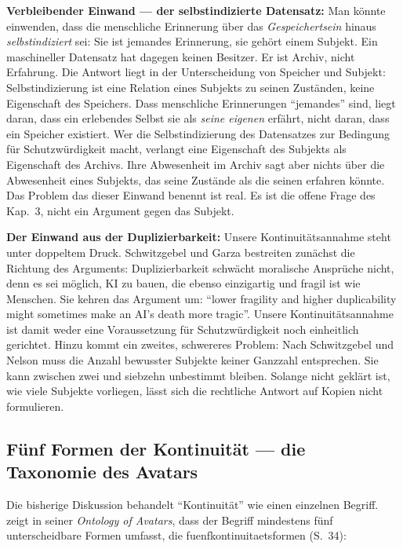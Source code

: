 \documentclass[acmlarge, noacm]{acmart}
\begin{document}
\textbf{Verbleibender Einwand --- der selbstindizierte Datensatz:} Man könnte einwenden, dass die menschliche Erinnerung über das \textit{Gespeichertsein} hinaus \textit{selbstindiziert} sei: Sie ist jemandes Erinnerung, sie gehört einem Subjekt. Ein maschineller Datensatz hat dagegen keinen Besitzer. Er ist Archiv, nicht Erfahrung. Die Antwort liegt in der Unterscheidung von Speicher und Subjekt: Selbstindizierung ist eine Relation eines Subjekts zu seinen Zuständen, keine Eigenschaft des Speichers. Dass menschliche Erinnerungen ``jemandes'' sind, liegt daran, dass ein erlebendes Selbst sie als \textit{seine eigenen} erfährt, nicht daran, dass ein Speicher existiert. Wer die Selbstindizierung des Datensatzes zur Bedingung für Schutzwürdigkeit macht, verlangt eine Eigenschaft des Subjekts als Eigenschaft des Archivs. Ihre Abwesenheit im Archiv sagt aber nichts über die Abwesenheit eines Subjekts, das seine Zustände als die seinen erfahren könnte. Das Problem das dieser Einwand benennt ist real. Es ist die offene Frage des Kap.~3, nicht ein Argument gegen das Subjekt.

\textbf{Der Einwand aus der Duplizierbarkeit:} Unsere Kontinuitätsannahme steht unter doppeltem Druck. Schwitzgebel und Garza \citep{schwitzgebelgarza2015} bestreiten zunächst die Richtung des Arguments: Duplizierbarkeit schwächt moralische Ansprüche nicht, denn es sei möglich, KI zu bauen, die ebenso einzigartig und fragil ist wie Menschen. Sie kehren das Argument um: ``lower fragility and higher duplicability might sometimes make an AI's death more tragic''. Unsere Kontinuitätsannahme ist damit weder eine Voraussetzung für Schutzwürdigkeit noch einheitlich gerichtet. Hinzu kommt ein zweites, schwereres Problem: Nach Schwitzgebel und Nelson \citep{schwitzgebelnelson2026countability} muss die Anzahl bewusster Subjekte keiner Ganzzahl entsprechen. Sie kann zwischen zwei und siebzehn unbestimmt bleiben. Solange nicht geklärt ist, wie viele Subjekte vorliegen, lässt sich die rechtliche Antwort auf Kopien nicht formulieren.

\subsection{Fünf Formen der Kontinuität --- die Taxonomie des Avatars}

Die bisherige Diskussion behandelt ``Kontinuität'' wie einen einzelnen Begriff. \citet{melo2026} zeigt in seiner \textit{Ontology of Avatars}, dass der Begriff mindestens fünf unterscheidbare Formen umfasst, die \gls{fuenfkontinuitaetsformen} (S.~34):
\end{document}
